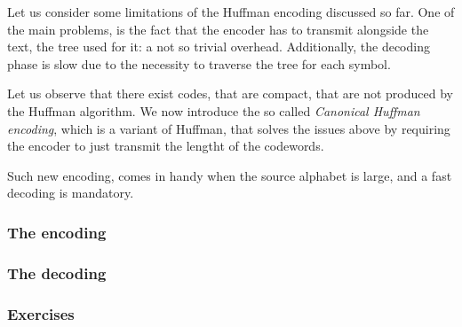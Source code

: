 \documentclass{subfiles}
\begin{document}
    Let us consider some limitations of the Huffman encoding discussed so far.
    One of the main problems, 
        is the fact that the encoder has to transmit alongside the text,
        the tree used for it: a not so trivial overhead.
    Additionally, 
        the decoding phase is slow due to the necessity to traverse the tree for each symbol.

    Let us observe that there exist codes, that are compact,
        that are not produced by the Huffman algorithm.
        We now introduce the so called \emph{Canonical Huffman encoding},
        which is a variant of Huffman, 
        that solves the issues above by requiring the encoder to just transmit the lengtht of the codewords.

    Such new encoding, comes in handy when the source alphabet is large, 
        and a fast decoding is mandatory.

    \subsubsection{The encoding}
    

    \subsubsection{The decoding}
    

    \subsubsection{Exercises}
    
\end{document}
